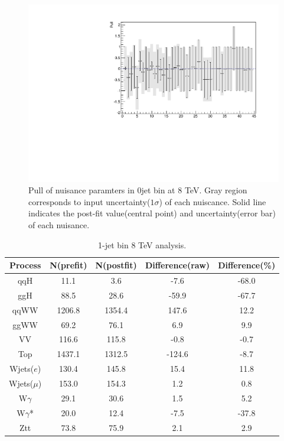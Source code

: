 \begin{figure}[!hbtp]
\centering 
\includegraphics[width=.75\textwidth]{figures/postnuisance_0j_8tev.pdf}
\caption{Pull of nuisance paramters in 0jet bin at 8 TeV.
Gray region corresponds to input uncertainty($1\sigma$) of each nuiscance.
Solid line indicates the post-fit value(central point) and uncertainty(error bar)
of each nuisance.}
\label{fig:nuisance_0j_8tev}
\end{figure} 
\clearpage 

\begin{table}[ht!]
\begin{center}
\begin{tabular}{c|cc|cc}
\hline \hline
Process     &    N(prefit) &   N(postfit) & Difference(raw) &  Difference(\%)  \\  
\hline \hline
qqH         &       11.1 &        3.6 &       -7.6 &      -68.0        \\
ggH         &       88.5 &       28.6 &      -59.9 &      -67.7        \\
\hline
qqWW        &     1206.8 &     1354.4 &      147.6 &       12.2        \\
ggWW        &       69.2 &       76.1 &        6.9 &        9.9        \\
\hline
VV          &      116.6 &      115.8 &       -0.8 &       -0.7        \\
\hline
Top         &     1437.1 &     1312.5 &     -124.6 &       -8.7        \\
\hline
Wjets($e$)  &      130.4 &      145.8 &       15.4 &       11.8        \\
Wjets($\mu$) &      153.0 &      154.3 &        1.2 &        0.8        \\
\hline
W$\gamma$   &       29.1 &       30.6 &        1.5 &        5.2        \\
W$\gamma$*  &       20.0 &       12.4 &       -7.5 &      -37.8        \\
\hline
Ztt         &       73.8 &       75.9 &        2.1 &        2.9        \\
\hline \hline
\end{tabular}
\caption{1-jet bin 8 TeV analysis.}
\label{tab:postnorm_1j_8tev}
\end{center}
\end{table}

